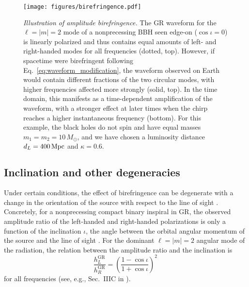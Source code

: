 \documentclass[aps,prd,twocolumn,superscriptaddress,preprintnumbers,floatfix,nofootinbib]{revtex4-2}
\begin{document}
\begin{figure}
    \texttt{[image: figures/birefringence.pdf]}
    \caption{
        \emph{Illustration of amplitude birefringence.} The GR waveform for the $\ell=|m|=2$ mode of a nonprecessing BBH seen edge-on ($\cos\iota = 0$) is linearly polarized and thus contains equal amounts of left- and right-handed modes for all frequencies (dotted, top).
        However, if spacetime were birefringent following Eq.~\protect\eqref{eq:waveform_modification}, the waveform observed on Earth would contain different fractions of the two circular modes, with higher frequencies affected more strongly (solid, top). 
        In the time domain, this manifests as a time-dependent amplification of the waveform, with a stronger effect at later times when the chirp reaches a higher instantaneous frequency (bottom).
        For this example, the black holes do not spin and have equal masses $m_1 = m_2 = 10\, M_\odot$, and we have chosen a luminosity distance $d_L = 400\, {\rm Mpc}$ and $\kappa = 0.6$.
        }
    \label{fig:birefringence}
\end{figure}

\subsection{Inclination and other degeneracies}
\label{sec:inclination}

Under certain conditions, the effect of birefringence can be degenerate with a change in the orientation of the source with respect to the line of sight \cite{Alexander:2009tp}.
Concretely, for a nonprecessing compact binary inspiral in \ac{GR}, the observed amplitude ratio of the left-handed and right-handed polarizations is only a function of the inclination $\iota$, the angle between the orbital angular momentum of the source and the line of sight \cite{Blanchet:2013haa}.
For  the dominant $\ell = |m| = 2$ angular mode of the radiation, the relation between the amplitude ratio and the inclination is
\begin{equation}
    \frac{h_{L}^\mathrm{GR}}{h^\mathrm{GR}_{R}}=\left(\frac{1-\cos\iota}{1+\cos\iota}\right)^2\,
\end{equation}
for all frequencies (see, e.g., Sec.~IIIC in \cite{Isi:2022mbx}).
\end{document}
